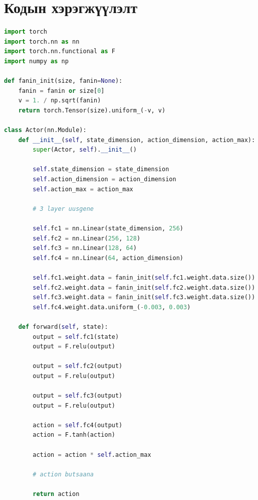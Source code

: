 \documentclass[12pt,A4]{report}
\begin{document}
\appendix
{}

\chapter{Кодын хэрэгжүүлэлт}

\begin{lstlisting}[language=Python, caption=models.py, frame=single]
import torch
import torch.nn as nn
import torch.nn.functional as F
import numpy as np

def fanin_init(size, fanin=None):
    fanin = fanin or size[0]
    v = 1. / np.sqrt(fanin)
    return torch.Tensor(size).uniform_(-v, v)

class Actor(nn.Module):
    def __init__(self, state_dimension, action_dimension, action_max):
        super(Actor, self).__init__()

        self.state_dimension = state_dimension
        self.action_dimension = action_dimension
        self.action_max = action_max

        # 3 layer uusgene

        self.fc1 = nn.Linear(state_dimension, 256)
        self.fc2 = nn.Linear(256, 128)
        self.fc3 = nn.Linear(128, 64)
        self.fc4 = nn.Linear(64, action_dimension)
        
        self.fc1.weight.data = fanin_init(self.fc1.weight.data.size())
        self.fc2.weight.data = fanin_init(self.fc2.weight.data.size())
        self.fc3.weight.data = fanin_init(self.fc3.weight.data.size())
        self.fc4.weight.data.uniform_(-0.003, 0.003)

    def forward(self, state):
        output = self.fc1(state)
        output = F.relu(output)

        output = self.fc2(output)
        output = F.relu(output)

        output = self.fc3(output)
        output = F.relu(output)

        action = self.fc4(output)
        action = F.tanh(action)

        action = action * self.action_max

        # action butsaana

        return action


\end{lstlisting}
\end{document}
